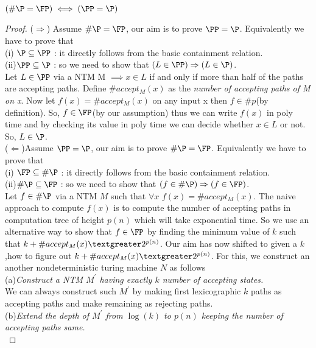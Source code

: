 \documentclass[11pt]{article}
\begin{document}
\begin{theorem}
 $(\#\P = \FP) \iff (\PP = \P)$
\end{theorem}
\begin{proof}
($\Rightarrow$) Assume $\#\P = \FP$, our aim is to prove $\PP = \P$. Equivalently we have to prove that\\
(i) $\P \subseteq \PP$ : it directly follows from the basic containment relation.\\
(ii)$\PP \subseteq \P$ : so we need to show that $(L \in \PP) \implies (L \in \P)$.\\
Let $L \in \PP$ via a NTM M $\implies x \in L$ if and only if more than half of the paths are accepting
paths. Define $\# accept_M(x)$ as the {\em number of accepting paths of M on x}. Now let $f(x)=\# accept_M(x)$
on any input x then $f \in \#p$(by definition). So, $f \in \FP$(by our assumption) thus we can write $f(x)$
in poly time and by checking its value in poly time we can decide whether $x \in L$ or not. So, $L \in \P$.\\

($\Leftarrow$)Assume $\PP = \P$, our aim is to prove $\#\P = \FP$. Equivalently we have to prove that\\
(i) $\FP \subseteq \#\P$ : it directly follows from the basic containment relation.\\
(ii)$\#\P \subseteq \FP$ : so we need to show that $(f \in \#\P) \implies (f \in \FP)$.\\
Let $f\in \#\P$ via a NTM $M$ such that $\forall x$ $f(x)=\# accept_M(x)$. The naive approach
to compute $f(x)$ is to compute the number of accepting paths in computation tree of height $p(n)$ which 
will take exponential time. So we use an alternative way to show that $f \in \FP$ by finding 
the minimum value of $k$ such that $k+\# accept_M(x)\textgreater 2^{p(n)}$. Our aim has now shifted to 
given a $k$,how to figure out $k+\# accept_M(x)\textgreater 2^{p(n)}$. For this, we construct an another 
nondeterministic turing machine $N$ as follows\\
(a){\em Construct a NTM $M^{'}$ having exactly $k$ number of accepting states.}\\

We can always construct such $M^{'}$ by making first lexicographic $k$ paths as accepting paths
and make remaining as rejecting paths.\\

(b){\em Extend the depth of $M^{'}$ from $\log(k)$ to $p(n)$ keeping the number of accepting paths same.}\\


\end{proof}
\end{document}
